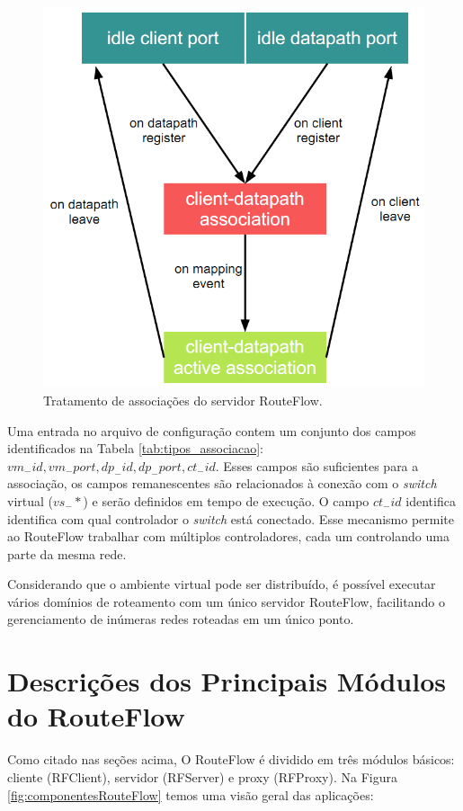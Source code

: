 \begin{figure}[h]
\centering
\includegraphics[width=120mm]{rfserverAssociacao.png}
\caption{Tratamento de associações do servidor RouteFlow.}
\label{fig:rfserverAssociacao} 
\end{figure}


Uma entrada no arquivo de configuração contem um conjunto 
dos campos identificados na Tabela \ref{tab:tipos_associacao}:
\textit{$vm_-id, vm_-port, dp_-id, dp_-port, ct_-id$}. Esses campos
são suficientes para a associação, os campos remanescentes
são relacionados à conexão com o \textit{switch} virtual ($vs_-*$) e serão
definidos em tempo de execução. O campo \textit{$ct_-id$} identifica
identifica com qual controlador o \textit{switch} está conectado. Esse
mecanismo permite ao RouteFlow trabalhar com múltiplos
controladores, cada um controlando uma parte da mesma rede.

Considerando que o ambiente virtual pode ser distribuído, é 
possível executar vários domínios de roteamento com um
único servidor RouteFlow, facilitando o gerenciamento de inúmeras 
redes roteadas em um único ponto.

\section{Descrições dos Principais Módulos do RouteFlow}
Como citado nas seções acima, O RouteFlow é dividido em 
três módulos básicos: cliente (RFClient), servidor (RFServer)
 e proxy (RFProxy). Na Figura
\ref{fig:componentesRouteFlow} temos uma visão geral das
aplicações:


